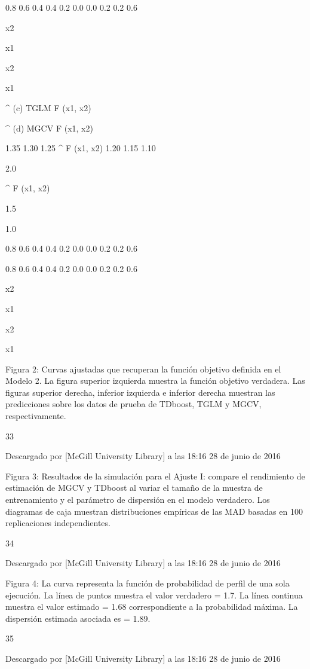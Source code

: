 \documentclass[]{article}
\begin{document}
0.8 0.6 0.4 0.4 0.2 0.0 0.0 0.2 0.2 0.6

x2

x1

x2

x1

\^{} (c) TGLM F (x1, x2)

\^{} (d) MGCV F (x1, x2)

1.35 1.30 1.25 \^{} F (x1, x2) 1.20 1.15 1.10

2.0

\^{} F (x1, x2)

1.5

1.0

0.8 0.6 0.4 0.4 0.2 0.0 0.0 0.2 0.2 0.6

0.8 0.6 0.4 0.4 0.2 0.0 0.0 0.2 0.2 0.6

x2

x1

x2

x1

Figura 2: Curvas ajustadas que recuperan la función objetivo definida en
el Modelo 2. La figura superior izquierda muestra la función objetivo
verdadera. Las figuras superior derecha, inferior izquierda e inferior
derecha muestran las predicciones sobre los datos de prueba de TDboost,
TGLM y MGCV, respectivamente.

33



Descargado por {[}McGill University Library{]} a las 18:16 28 de junio
de 2016

Figura 3: Resultados de la simulación para el Ajuste I: compare el
rendimiento de estimación de MGCV y TDboost al variar el tamaño de la
muestra de entrenamiento y el parámetro de dispersión en el modelo
verdadero. Los diagramas de caja muestran distribuciones empíricas de
las MAD basadas en 100 replicaciones independientes.

34



Descargado por {[}McGill University Library{]} a las 18:16 28 de junio
de 2016

Figura 4: La curva representa la función de probabilidad de perfil de
una sola ejecución. La línea de puntos muestra el valor verdadero = 1.7.
La línea continua muestra el valor estimado = 1.68 correspondiente a la
probabilidad máxima. La dispersión estimada asociada es = 1.89.

35



Descargado por {[}McGill University Library{]} a las 18:16 28 de junio
de 2016
\end{document}

